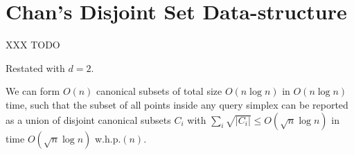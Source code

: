 \section{Chan's Disjoint Set Data-structure}
\label{:prelim:chan}

XXX TODO

Restated with $d=2$.

\begin{theorem}
\label{th:chan}
We can form $O(n)$ canonical subsets of total size $O(n \log{n})$ in $O(n \log{n})$ time, such that the subset of all points inside any query simplex can be reported as a union of disjoint canonical subsets $C_i$ with $\sum_i{\sqrt{|C_i|}} \leq O(\sqrt{n}\log{n})$ in time $O(\sqrt{n}\log{n})$ w.h.p.$(n)$.
\end{theorem}

